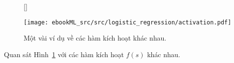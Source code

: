 \begin{figure}[t]
    [\FBwidth]
    {\caption{ 
    Một vài ví dụ về các hàm kích hoạt khác nhau.
    }
    \label{fig:10_activation}}
    { %
    \texttt{[image: ebookML\_src/src/logistic\_regression/activation.pdf]}
    }
\end{figure}
Quan sát Hình~\ref{fig:10_activation} với các hàm kích hoạt $f(s)$ khác nhau.
